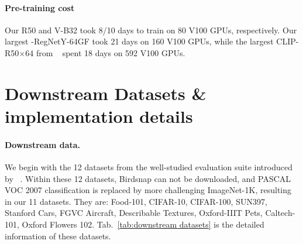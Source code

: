 \paragraph{Pre-training cost} Our R50 and V-B32 took 8/10 days to train on 80 V100 GPUs, respectively. Our largest \workname-RegNetY-64GF took 21 days on 160 V100 GPUs, while the largest CLIP-R50$\times$64 from ~\citep{radford2021learning} spent 18 days on 592 V100 GPUs.

\section{Downstream Datasets \& implementation details}\label{Downstream Datasets}

\paragraph{Downstream data.} We begin with the 12 datasets from the well-studied evaluation suite introduced by ~\citet{kornblith2019better}. 
Within these 12 datasets, Birdsnap can not be downloaded, and PASCAL VOC 2007 classification is replaced by more challenging ImageNet-1K, resulting in our 11 datasets.
They are: Food-101, CIFAR-10, CIFAR-100, SUN397, Stanford Cars, FGVC Aircraft, Describable Textures, Oxford-IIIT Pets, Caltech-101, Oxford Flowers 102. Tab.~\ref{tab:downstream datasets} is the detailed information of these datasets.


